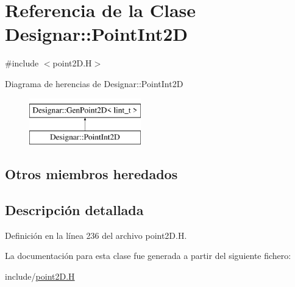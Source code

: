 \hypertarget{class_designar_1_1_point_int2_d}{}\section{Referencia de la Clase Designar\+:\+:Point\+Int2D}
\label{class_designar_1_1_point_int2_d}


{\ttfamily \#include $<$point2\+D.\+H$>$}

Diagrama de herencias de Designar\+:\+:Point\+Int2D\begin{figure}[H]
\begin{center}
\leavevmode
\includegraphics[height=2.000000cm]{class_designar_1_1_point_int2_d}
\end{center}
\end{figure}
\subsection*{Otros miembros heredados}


\subsection{Descripción detallada}


Definición en la línea 236 del archivo point2\+D.\+H.



La documentación para esta clase fue generada a partir del siguiente fichero\+:\begin{DoxyCompactItemize}
\item 
include/\hyperlink{point2_d_8_h}{point2\+D.\+H}\end{DoxyCompactItemize}
